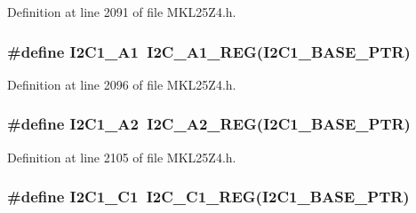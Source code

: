 Definition at line 2091 of file M\+K\+L25\+Z4.\+h.

\subsubsection[{\texorpdfstring{I2\+C1\+\_\+\+A1}{I2C1_A1}}]{\setlength{\rightskip}{0pt plus 5cm}\#define I2\+C1\+\_\+\+A1~{\bf I2\+C\+\_\+\+A1\+\_\+\+R\+EG}({\bf I2\+C1\+\_\+\+B\+A\+S\+E\+\_\+\+P\+TR})}\hypertarget{group___i2_c___register___accessor___macros_ga1488ec8f3fd718170359dfc0045ee8e1}{}\label{group___i2_c___register___accessor___macros_ga1488ec8f3fd718170359dfc0045ee8e1}


Definition at line 2096 of file M\+K\+L25\+Z4.\+h.

\subsubsection[{\texorpdfstring{I2\+C1\+\_\+\+A2}{I2C1_A2}}]{\setlength{\rightskip}{0pt plus 5cm}\#define I2\+C1\+\_\+\+A2~{\bf I2\+C\+\_\+\+A2\+\_\+\+R\+EG}({\bf I2\+C1\+\_\+\+B\+A\+S\+E\+\_\+\+P\+TR})}\hypertarget{group___i2_c___register___accessor___macros_gaa4539c51795162a3fccf19384acf78f0}{}\label{group___i2_c___register___accessor___macros_gaa4539c51795162a3fccf19384acf78f0}


Definition at line 2105 of file M\+K\+L25\+Z4.\+h.

\subsubsection[{\texorpdfstring{I2\+C1\+\_\+\+C1}{I2C1_C1}}]{\setlength{\rightskip}{0pt plus 5cm}\#define I2\+C1\+\_\+\+C1~{\bf I2\+C\+\_\+\+C1\+\_\+\+R\+EG}({\bf I2\+C1\+\_\+\+B\+A\+S\+E\+\_\+\+P\+TR})}\hypertarget{group___i2_c___register___accessor___macros_gaab6dde59f93972ca970c31a59c9f8a6b}{}\label{group___i2_c___register___accessor___macros_gaab6dde59f93972ca970c31a59c9f8a6b}


